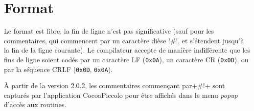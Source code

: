 \section{Format}

Le format est libre, la fin de ligne n’est pas significative (sauf pour les commentaires, qui commencent par un caractère dièse \pic!#!, et s’étendent jusqu’à la fin de la ligne courante). Le compilateur accepte de manière indifférente que les fins de ligne soient codés par un caractère LF (\texttt{0x0A}), un caractère CR (\texttt{0x0D}), ou par la séquence CRLF (\texttt{0x0D}, \texttt{0x0A}).

À partir de la version 2.0.2, les commentaires commençant par\pic+#!+ sont capturés par l'application CocoaPiccolo pour être affichés dans le menu \emph{popup} d'accès aux routines.

